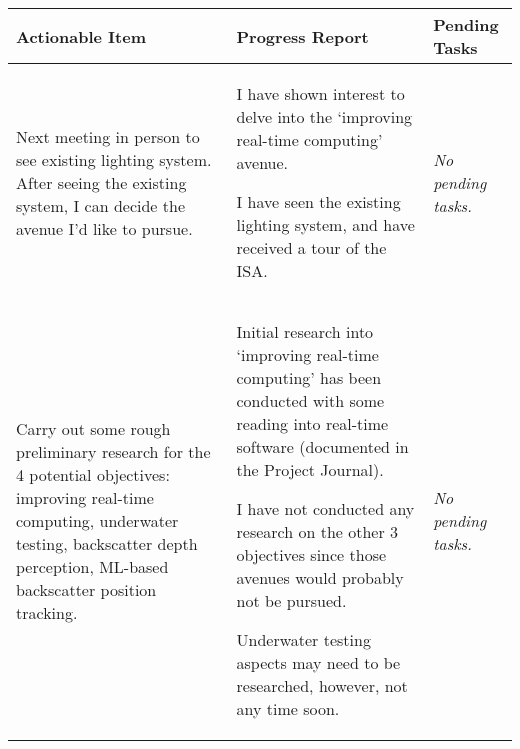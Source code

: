 \begin{table}[!h]
    \centering
    \begin{tabularx}{\textwidth}{|X|X|X|}
        \hline
        Actionable Item & Progress Report & Pending Tasks \\
        \hline
        \hline
        \begin{myitemize}
            \item Next meeting in person to see existing lighting system. After seeing the existing system, I can decide the avenue I'd like to pursue.
        \end{myitemize} & 
        \begin{myitemize}
            \item I have shown interest to delve into the `improving real-time computing' avenue.
            \item I have seen the existing lighting system, and have received a tour of the ISA.
        \end{myitemize} & 
        \begin{myitemize}
            \item \textit{No pending tasks.}
        \end{myitemize} \\
        \hline
        \begin{myitemize}
            \item Carry out some rough preliminary research for the 4 potential objectives: improving real-time computing, underwater testing, backscatter depth perception, ML-based backscatter position tracking.
        \end{myitemize} & 
        \begin{myitemize}
            \item Initial research into `improving real-time computing' has been conducted with some reading into real-time software (documented in the Project Journal).
            \item I have not conducted any research on the other 3 objectives since those avenues would probably not be pursued.
            \item Underwater testing aspects may need to be researched, however, not any time soon.
        \end{myitemize} & 
        \begin{myitemize}
            \item \textit{No pending tasks.}
        \end{myitemize} \\
        \hline
    \end{tabularx}
\end{table}
